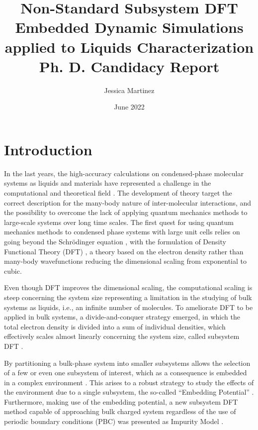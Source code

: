 \documentclass[notitlepage,12pt]{report}
\begin{document}
	\title{ Non-Standard Subsystem DFT Embedded Dynamic Simulations applied to Liquids Characterization \\ ${}$ \\ \large Ph. D. Candidacy Report}
	\author[1]{Jessica Martinez}
	\date{June 2022}
	\renewcommand\Affilfont{\itshape\small}
	\thispagestyle{empty}
	
\begin{titlepage}
	\maketitle
\end{titlepage}
	
\section{Introduction}
	In the last years, the high-accuracy calculations on condensed-phase molecular systems as liquids and materials have represented a challenge in the computational and theoretical field \supercite{RN43, RN46, RN48}. The development of theory target the correct description for the many-body nature of inter-molecular interactions\supercite{RN46, RN45}, and the possibility to overcome the lack of applying quantum mechanics methods to large-scale systems over long time scales\supercite{RN49}. The first quest for using quantum mechanics methods to condensed phase systems with large unit cells relies on going beyond the Schrödinger equation \supercite{schrodinger1926undulatory}, with the formulation of Density Functional Theory (DFT) \supercite{thomas1927calculation,fermi1927statistical, hogenberg, kohn}, a theory based on the electron density rather than many-body wavefunctions reducing the dimensional scaling from exponential to cubic.   

	Even though DFT improves the dimensional scaling, the computational scaling is steep concerning the system size \supercite{RN47} representing a limitation in the studying of bulk systems as liquids, i.e., an infinite number of molecules. To ameliorate DFT to be applied in bulk systems, a divide-and-conquer strategy emerged, in which the total electron density is divided into a sum of individual densities, which effectively scales almost linearly concerning the system size, called subsystem DFT \supercite{mi2021eqe,mi2019nonlocal,mi2019ab}.

	By partitioning a bulk-phase system into smaller subsystems allows the selection of a few or even one subsystem of interest, which as a consequence is embedded in a complex environment \supercite{schmitt2020frozen}. This arises to a robust strategy to study the effects of the environment due to a single subsystem, the so-called “Embedding Potential” \supercite{genova2016avoiding}. Furthermore, making use of the embedding potential, a new subsystem DFT method capable of approaching bulk charged system regardless of the use of periodic boundary conditions (PBC) was presented as Impurity Model \supercite{tolle2019charged}. 
\end{document}
